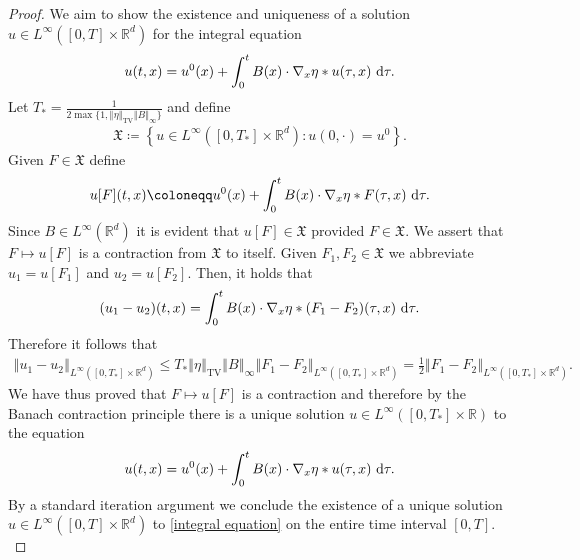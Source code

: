 \documentclass[11pt,reqno]{amsart}
\numberwithin{equation}{section}
\def\dd{{\rm d}}
\begin{document}
\begin{proof}
We aim to show the existence and uniqueness of a solution $u\in L^{\infty}([0,T]\times \mathbb{R}^{d})$ for the integral equation 
\begin{align}
 u(t,x)=u^{0}(x)+\int_{0}^{t}B(x)\cdot \nabla_{x}\eta\ast u(\tau,x)\ \dd \tau.   \label{integral equation} 
\end{align}
Let $T_{\ast}=\frac{1}{2\max\{1,\left\Vert \eta\right\Vert_{\mathrm{TV}} \left\Vert B\right\Vert_{\infty} \}}$ and define
\begin{align*}
\mathfrak{X}\coloneqq \left\{u\in L^{\infty}([0,T_{\ast}]\times \mathbb{R}^{d}):u(0,\cdot)=u^{0}\right\}.   \end{align*}
Given $F\in \mathfrak{X}$ define   
\begin{align*}
u[F](t,x)\coloneqq u^{0}(x)+\int_{0}^{t}B(x)\cdot \nabla_{x}\eta\ast F(\tau,x)\ \dd \tau.   \end{align*}
Since $B\in L^{\infty}(\mathbb{R}^{d})$ it is evident that $u[F]\in \mathfrak{X}$ provided $F\in \mathfrak{X}$. We assert that $F\mapsto u[F]$ is a contraction from $\mathfrak{X}$ to itself. Given $F_{1},F_{2}\in \mathfrak{X}$ we abbreviate $u_{1}=u[F_{1}]$ and $u_{2}=u[F_{2}]$.  
Then, it holds that 
\begin{align*}
(u_{1}-u_{2})(t,x)=\int_{0}^{t}B(x)\cdot \nabla_{x}\eta\ast 
(F_{1}-F_{2})(\tau,x) \ \dd \tau.
\end{align*} 
Therefore it follows that 
\begin{align*}
\left\Vert u_{1}-u_{2}\right\Vert_{L^{\infty}([0,T_{\ast}]\times \mathbb{R}^{d})}\leq T_{\ast}\left\Vert \eta\right\Vert_{\mathrm{TV}}\left\Vert B\right\Vert_{\infty}\left\Vert F_{1}-F_{2}\right\Vert_{L^{\infty}([0,T_{\ast}]\times \mathbb{R}^{d})}= \frac{1}{2}\left\Vert F_{1}-F_{2}\right\Vert_{L^{\infty}([0,T_{\ast}]\times \mathbb{R}^{d})} .  \end{align*}
We have thus proved that $F\mapsto u[F]$ is a contraction and therefore by the Banach contraction principle there is a unique solution $u\in L^{\infty}([0,T_{\ast}]\times \mathbb{R})$ to the equation 
\begin{align}
u(t,x)=u^{0}(x)+\int_{0}^{t}B(x)\cdot \nabla_{x}\eta\ast u(\tau,x)\ \dd \tau. \label{integral version}  \end{align}
By a standard iteration argument we conclude the existence of a unique solution $u\in L^{\infty}([0,T]\times \mathbb{R}^{d})$ to \eqref{integral equation} on the entire time interval $[0,T]$. \\

\end{proof}
\end{document}
